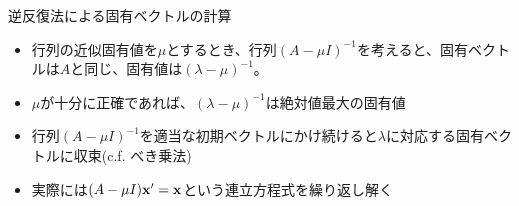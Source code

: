 \begin{frame}[t,fragile]{逆反復法による固有ベクトルの計算}
  \begin{itemize}
    \setlength{\itemsep}{1em}
  \item 行列の近似固有値を$\mu$とするとき、行列$(A - \mu I)^{-1}$を考えると、固有ベクトルは$A$と同じ、固有値は$(\lambda-\mu)^{-1}$。
  \item $\mu$が十分に正確であれば、$(\lambda-\mu)^{-1}$は絶対値最大の固有値
  \item 行列$(A - \mu I)^{-1}$を適当な初期ベクトルにかけ続けると$\lambda$に対応する固有ベクトルに収束(c.f. べき乗法)
  \item 実際には$(A-\mu I) {\bf x}' = {\bf x}$という連立方程式を繰り返し解く
  \end{itemize}
\end{frame}
